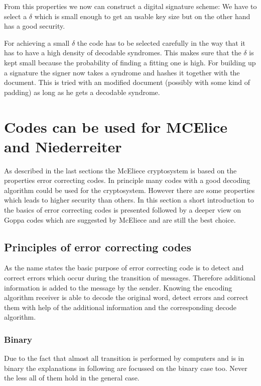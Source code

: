 From this properties we now can construct a digital signature scheme: We have to select a $\delta$ which is small enough to get an usable key size but on the other hand has a good security. 

For achieving a small $\delta$ the code has to be selected carefully in the way that it has to have a high density of decodable syndromes. This makes sure that the $\delta$ is kept small because the probability of finding a fitting one is high. For building up a signature the signer now takes a syndrome and hashes it together with the document. This is tried with an modified document (possibly with some kind of padding) as long as he gets a decodable syndrome. \cite{courtois2001achieve}


\section{Codes can be used for MCElice and Niederreiter} 
As described in the last sections the McEliece cryptosystem is based on the properties error correcting codes. In principle many codes with a good decoding algorithm could be used for the cryptosystem. However there are some properties which leads to higher security than others. In this section a short introduction to the basics of error correcting codes is presented followed by a deeper view on Goppa codes which are suggested by McEliece and are still the best choice.

\subsection{Principles of error correcting codes}
As the name states the basic purpose of error correcting code is to detect and correct errors which occur during the transition of messages. Therefore additional information is added to the message by the sender. Knowing the encoding algorithm receiver is able to decode the original word, detect errors and correct them with help of the additional information and the corresponding decode algorithm. 

\subsubsection*{Binary} Due to the fact that almost all transition is performed by computers and is in binary the explanations in following are focussed on the binary case too. Never the less all of them hold in the general case. 



